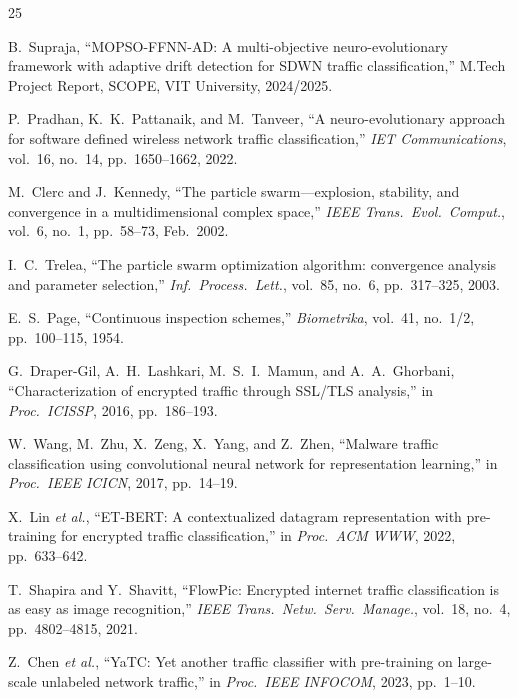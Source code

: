 \documentclass[journal]{IEEEtran}
\begin{document}
\begin{thebibliography}{25}

B.~Supraja, ``MOPSO-FFNN-AD: A multi-objective neuro-evolutionary framework
with adaptive drift detection for SDWN traffic classification,''
M.Tech Project Report, SCOPE, VIT University, 2024/2025.

P.~Pradhan, K.~K.~Pattanaik, and M.~Tanveer, ``A neuro-evolutionary approach
for software defined wireless network traffic classification,''
\textit{IET Communications}, vol.~16, no.~14, pp.~1650--1662, 2022.

M.~Clerc and J.~Kennedy, ``The particle swarm---explosion, stability, and
convergence in a multidimensional complex space,''
\textit{IEEE Trans.\ Evol.\ Comput.}, vol.~6, no.~1, pp.~58--73, Feb.\ 2002.

I.~C.~Trelea, ``The particle swarm optimization algorithm: convergence analysis
and parameter selection,''
\textit{Inf.\ Process.\ Lett.}, vol.~85, no.~6, pp.~317--325, 2003.

E.~S.~Page, ``Continuous inspection schemes,''
\textit{Biometrika}, vol.~41, no.~1/2, pp.~100--115, 1954.

G.~Draper-Gil, A.~H.~Lashkari, M.~S.~I.~Mamun, and A.~A.~Ghorbani,
``Characterization of encrypted traffic through SSL/TLS analysis,''
in \textit{Proc.\ ICISSP}, 2016, pp.~186--193.

W.~Wang, M.~Zhu, X.~Zeng, X.~Yang, and Z.~Zhen, ``Malware traffic
classification using convolutional neural network for representation
learning,'' in \textit{Proc.\ IEEE ICICN}, 2017, pp.~14--19.

X.~Lin \textit{et al.}, ``ET-BERT: A contextualized datagram representation
with pre-training for encrypted traffic classification,''
in \textit{Proc.\ ACM WWW}, 2022, pp.~633--642.

T.~Shapira and Y.~Shavitt, ``FlowPic: Encrypted internet traffic classification
is as easy as image recognition,''
\textit{IEEE Trans.\ Netw.\ Serv.\ Manage.}, vol.~18, no.~4,
pp.~4802--4815, 2021.

Z.~Chen \textit{et al.}, ``YaTC: Yet another traffic classifier with
pre-training on large-scale unlabeled network traffic,''
in \textit{Proc.\ IEEE INFOCOM}, 2023, pp.~1--10.


\end{thebibliography}
\end{document}
